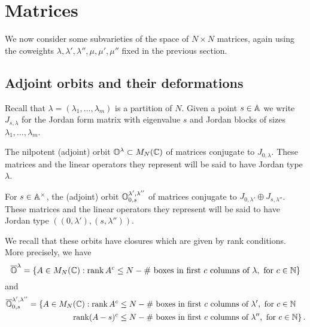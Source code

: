 \documentclass{article}
\begin{document}
\section{Matrices}
\label{s:mats}
% 
We now consider some subvarieties of the space of $ N\times N$ matrices, again using the coweights $ \lambda, \lambda', \lambda'', \mu, \mu', \mu''$ fixed in the previous section. 

\subsection{Adjoint orbits and their deformations}
\label{ss:familiesofadjointorbits}
% 
Recall that $\lambda=(\lambda_1,\dots,\lambda_m)$ is a partition of $ N$.
% 
Given a point $ s \in \AA$ we write $ J_{s,\lambda}$ for the Jordan form matrix with eigenvalue $ s$ and Jordan blocks of sizes $ \lambda_1, \dots, \lambda_m$.
    
\begin{definition}
\label{def:Olam}
The nilpotent (adjoint) orbit $ \OO^\lambda \subset M_N(\CC)$ of matrices conjugate to $ J_{0,\lambda}$. These matrices and the linear operators they represent will be said to have Jordan type $\lambda$.
\end{definition}  
% 
\begin{definition}
\label{def:Olamlam}
    For $ s \in \Ax$, the (adjoint) orbit $ \OO^{\lambda', \lambda''}_{0,s}$ of matrices conjugate to $ J_{0,\lambda'} \oplus J_{s,\lambda''}$.
    These matrices and the linear operators they represent will be said to have Jordan type $((0,\lambda'), (s,\lambda''))$.
\end{definition}  
% 
     
We recall that these orbits have closures which are given by rank conditions.  
More precisely, we have
$$
    \overline{\OO}^\lambda = \{ A \in M_N(\CC) : \rk A^c \le N - \#\text{~boxes in first $c$ columns of }\lambda,  \text{ for $ c \in \NN$} \}
$$
and
\begin{equation} 
\label{eq:ranks}
\begin{split}
    \overline{\OO}^{\lambda', \lambda''}_{0,s} = \{ A \in M_N(\CC) : \rk A^c &\le N - 
    \#\text{~boxes in first $c$ columns of }\lambda',  \text{ for $ c \in \NN$} \\
    \rk (A-s)^c &\le N - \#\text{~boxes in first $c$ columns of }\lambda'',  \text{ for $ c \in \NN$} \}\,. 
\end{split}
\end{equation}
%  
\end{document}
